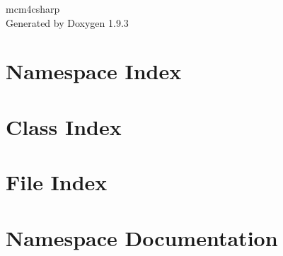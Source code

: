 \documentclass[twoside]{book}
\newcommand{\+}{\discretionary{\mbox{\scriptsize$\hookleftarrow$}}{}{}}
\newcommand{\clearemptydoublepage}{%
    \newpage{\pagestyle{empty}\cleardoublepage}%
  }
\begin{document}
  \raggedbottom
    \hypersetup{pageanchor=false,
                bookmarksnumbered=true,
                pdfencoding=unicode
               }
  \begin{titlepage}
  \vspace*{7cm}
  \begin{center}%
  {\Large mcm4csharp}\\
  \vspace*{1cm}
  {\large Generated by Doxygen 1.9.3}\\
  \end{center}
  \end{titlepage}
  \clearemptydoublepage
  \tableofcontents
  \clearemptydoublepage
  \hypersetup{pageanchor=true}
\chapter{Namespace Index}

\chapter{Class Index}

\chapter{File Index}

\chapter{Namespace Documentation}










\end{document}
